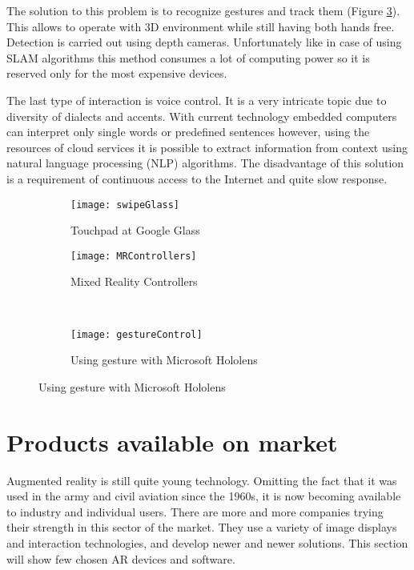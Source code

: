 \documentclass[printmode,en]{mgr}
\begin{document}
The solution to this problem is to recognize gestures and track them (Figure \ref{fig:gestureControl}). This allows to operate with 3D environment while still having both hands free. Detection is carried out using depth cameras. Unfortunately like in case of using SLAM algorithms this method consumes a lot of computing power so it is reserved only for the most expensive devices.

The last type of interaction is voice control. It is a very intricate topic due to diversity of dialects and accents. With current technology embedded computers can interpret only single words or predefined sentences however, using the resources of cloud services it is possible to extract information from context using natural language processing (NLP) algorithms. The disadvantage of this solution is a requirement of continuous access to the Internet and quite slow response.

\begin{figure}[!ht]
\centering
\begin{subfigure}{.5\textwidth}
  \centering
  \texttt{[image: swipeGlass]}
  \caption{Touchpad at Google Glass \cite{swipeGlass}}
  \label{fig:swipeGlass}
\end{subfigure}%
\begin{subfigure}{.5\textwidth}
  \centering
  \texttt{[image: MRControllers]}
  \caption{Mixed Reality Controllers \cite{MRControllers}}
  \label{fig:MRControllers}
\end{subfigure}\\
\begin{subfigure}{.5\textwidth}
  \centering
  \texttt{[image: gestureControl]}
  \caption{Using gesture with Microsoft Hololens \cite{gestureControl}}
  \label{fig:gestureControl}
\end{subfigure}%
\label{fig:ARInteraction}
\end{figure}

\section{Products available on market}
Augmented reality is still quite young technology. Omitting the fact that it was used in the army and civil aviation since the 1960s, it is now becoming available to industry and individual users. There are more and more companies trying their strength in this sector of the market. They use a variety of image displays and interaction technologies, and develop newer and newer solutions. This section will show few chosen AR devices and software.
\end{document}
